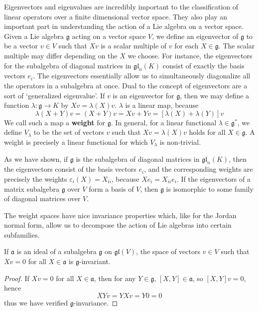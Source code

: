 Eigenvectors and eigenvalues are incredibly important to the classification of linear operators over a finite dimensional vector space. They also play an important part in understanding the action of a Lie algebra on a vector space. Given a Lie algebra $\mathfrak{g}$ acting on a vector space $V$, we define an eigenvector of $\mathfrak{g}$ to be a vector $v \in V$ such that $Xv$ is a scalar multiple of $v$ for each $X \in \mathfrak{g}$. The scalar multiple may differ depending on the $X$ we choose. For instance, the eigenvectors for the subalgebra of diagonal matrices in $\mathfrak{gl}_n(K)$ consist of exactly the basis vectors $e_i$. The eigenvectors essentially allow us to simultaneously diagonalize all the operators in a subalgebra at once. Dual to the concept of eigenvectors are a sort of `generalized eigenvalue'. If $v$ is an eigenvector for $\mathfrak{g}$, then we may define a function $\lambda: \mathfrak{g} \to K$ by $Xv = \lambda(X) v$. $\lambda$ is a linear map, because
%
\[ \lambda(X + Y)v = (X + Y)v = Xv + Yv = [\lambda(X) + \lambda(Y)]v \]
%
We call such a map a {\bf weight} for $\mathfrak{g}$. In general, for a linear functional $\lambda \in \mathfrak{g}^*$, we define $V_\lambda$ to be the set of vectors $v$ such that $Xv = \lambda(X)v$ holds for all $X \in \mathfrak{g}$. A weight is precisely a linear functional for which $V_\lambda$ is non-trivial.

\begin{example}
    As we have shown, if $\mathfrak{g}$ is the subalgebra of diagonal matrices in $\mathfrak{gl}_n(K)$, then the eigenvectors consist of the basis vectors $e_i$, and the corresponding weights are precisely the weights $\varepsilon_i(X) = X_{ii}$, because $Xe_i = X_{ii} e_i$. If the eigenvectors of a matrix subalgebra $\mathfrak{g}$ over $V$ form a basis of $V$, then $\mathfrak{g}$ is isomorphic to some family of diagonal matrices over $V$.
\end{example}

The weight spaces have nice invariance properties which, like for the Jordan normal form, allow us to decompose the action of Lie algebras into certain subfamilies.

\begin{lemma}
    If $\mathfrak{a}$ is an ideal of a subalgebra $\mathfrak{g}$ on $\mathfrak{gl}(V)$, the space of vectors $v \in V$ such that $Xv = 0$ for all $X \in \mathfrak{a}$ is $\mathfrak{g}$-invariant.
\end{lemma}
\begin{proof}
    If $Xv = 0$ for all $X \in \mathfrak{a}$, then for any $Y \in \mathfrak{g}$, $[X,Y] \in \mathfrak{a}$, so $[X,Y]v = 0$, hence
    \[ XYv = YXv = Y0 = 0 \]
    thus we have verified $\mathfrak{g}$-invariance.
\end{proof}

